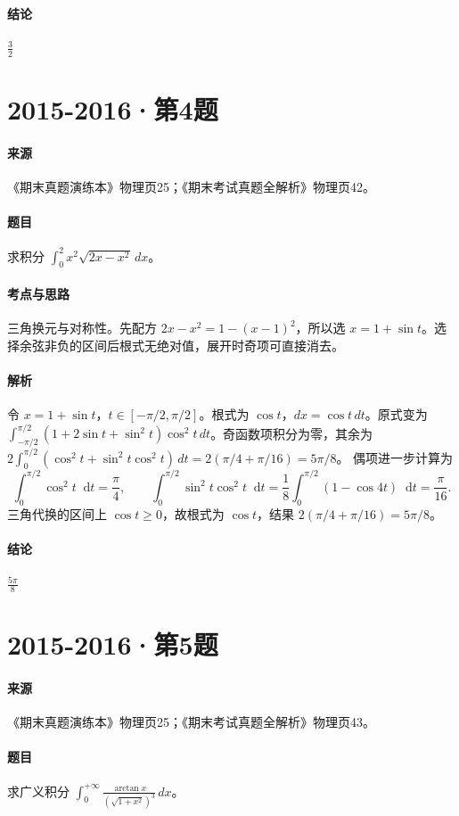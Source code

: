 \documentclass[UTF8,fontset=fandol,12pt,oneside,openany]{ctexrep}
\newcommand{\dd}{\mathop{}\!\mathrm d}
\theoremstyle{definition}
\begin{document}
\paragraph{结论}
$\frac32$

\par\addvspace{18pt}\noindent\begin{minipage}{\linewidth}
\section{2015-2016·第4题}
\label{exam:11:q31}
\paragraph{来源} 《期末真题演练本》物理页25；《期末考试真题全解析》物理页42。
\paragraph{题目}
求积分 $\int_0^2x^2\sqrt{2x-x^2}\,dx$。
\end{minipage}\par
\paragraph{考点与思路}
三角换元与对称性。先配方 $2x-x^2=1-(x-1)^2$，所以选 $x=1+\sin t$。选择余弦非负的区间后根式无绝对值，展开时奇项可直接消去。
\paragraph{解析}
令 $x=1+\sin t$，$t\in[-\pi/2,\pi/2]$。根式为 $\cos t$，$dx=\cos t\,dt$。原式变为 $\int_{-\pi/2}^{\pi/2}(1+2\sin t+\sin^2t)\cos^2t\,dt$。奇函数项积分为零，其余为 $2\int_0^{\pi/2}(\cos^2t+\sin^2t\cos^2t)\,dt=2(\pi/4+\pi/16)=5\pi/8$。
偶项进一步计算为
\[
\int_0^{\pi/2}\cos^2t\dd t=\frac\pi4,\qquad
\int_0^{\pi/2}\sin^2t\cos^2t\dd t
=\frac18\int_0^{\pi/2}(1-\cos4t)\dd t=\frac\pi{16}.
\]
三角代换的区间上 $\cos t\ge0$，故根式为 $\cos t$，结果 $2(\pi/4+\pi/16)=5\pi/8$。
\paragraph{结论}
$\frac{5\pi}8$

\par\addvspace{18pt}\noindent\begin{minipage}{\linewidth}
\section{2015-2016·第5题}
\label{exam:11:q32}
\paragraph{来源} 《期末真题演练本》物理页25；《期末考试真题全解析》物理页43。
\paragraph{题目}
求广义积分 $\int_0^{+\infty}\frac{\arctan x}{(\sqrt{1+x^2})^3}\,dx$。
\end{minipage}\par
\end{document}

